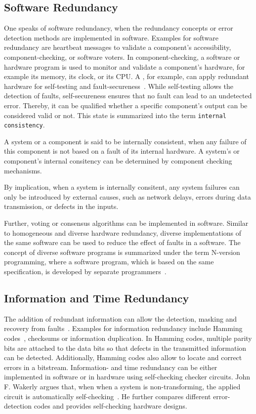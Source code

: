 \subsection{Software Redundancy}
One speaks of software redundancy, when the redundancy concepts or error detection methods are implemented in software.
Examples for software redundancy are heartbeat messages to validate a component's accessibility, component-checking, or software voters.
In component-checking, a software or hardware program is used to monitor and validate a component's hardware, for example its memory, its clock, or its \gls*{CPU}.
A , for example, can apply redundant hardware for self-testing and fault-secureness~\cite{SelfCheckingProcessorDesign}.
While self-testing allows the detection of faults, self-secureness ensures that no fault can lead to an undetected error.
Thereby, it can be qualified whether a specific component's output can be considered valid or not.
This state is summarized into the term \texttt{internal consistency}.

\begin{definition}
A system or a component is said to be internally consistent, when any failure of this component is not based on a fault of its internal hardware.
A system's or component's internal consitency can be determined by component checking mechanisms.
\end{definition}

By implication, when a system is internally consitent, any system failures can only be introduced by external causes, such as network delays, errors during data transmission, or defects in the inputs.

Further, voting or consensus algorithms can be implemented in software.
Similar to homogeneous and diverse hardware redundancy, diverse implementations of the same software can be used to reduce the effect of faults in a software.
The concept of diverse software programs is summarized under the term N-version programming, where a software program, which is based on the same specification, is developed by separate programmers~\cite{BarryFaultToleranceAnalysis}.

\subsection{Information and Time Redundancy}
The addition of redundant information can allow the detection, masking and recovery from faults~\cite{BarryFaultToleranceAnalysis}.
Examples for information redundancy include Hamming codes~\cite{HammingCodes}, checksums or information duplication.
In Hamming codes, multiple parity bits are attached to the data bits so that defects in the transmitted information can be detected.
Additionally, Hamming codes also allow to locate and correct errors in a bitstream.
Information- and time redundancy can be either implemented in software or in hardware using self-checking checker circuits.
John F. Wakerly argues that, when when a system is non-transforming, the applied circuit is automatically self-checking~\cite{SelfCheckingProcessorDesign}.
He further compares different error-detection codes and provides self-checking hardware designs.

